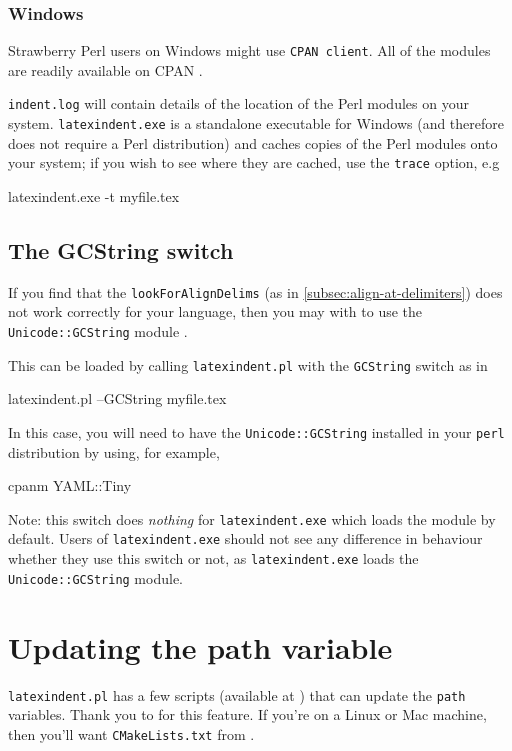  \subsubsection{Windows}
  Strawberry Perl users on Windows might use \texttt{CPAN client}. All of the modules are
  readily available on CPAN \cite{cpan}.

  \texttt{indent.log} will contain details of the location
  of the Perl modules on your system. \texttt{latexindent.exe} is a standalone executable
  for Windows (and therefore does not require a Perl distribution) and caches copies of the
  Perl modules onto your system; if you wish to see where they are cached, use the
  \texttt{trace} option, e.g
  \begin{dosprompt}
latexindent.exe -t myfile.tex
 \end{dosprompt}

 \subsection{The GCString switch}\label{subsec:the-GCString}
  If you find that the \texttt{lookForAlignDelims} (as in \cref{subsec:align-at-delimiters}) does not work correctly
  for your language, then you may with to use the \texttt{Unicode::GCString} module .

  This can be loaded by calling \texttt{latexindent.pl} with the \texttt{GCString} switch
  as in
  \begin{commandshell}
latexindent.pl --GCString myfile.tex
\end{commandshell}
  In this case, you will need to have the \texttt{Unicode::GCString} installed in your
  \texttt{perl} distribution by using, for example,
  \begin{commandshell}
cpanm YAML::Tiny
\end{commandshell}

  Note: this switch does \emph{nothing} for \texttt{latexindent.exe} which loads the module
  by default. Users of \texttt{latexindent.exe} should not see any difference in behaviour
  whether they use this switch or not, as \texttt{latexindent.exe} loads the
  \texttt{Unicode::GCString} module.

 \section{Updating the path variable}\label{sec:updating-path}
  \texttt{latexindent.pl} has a few scripts (available at \cite{latexindent-home}) that can
  update the \texttt{path} variables. Thank you to \cite{jasjuang} for this feature. If
  you're on a Linux or Mac machine, then you'll want \texttt{CMakeLists.txt} from
  \cite{latexindent-home}.
